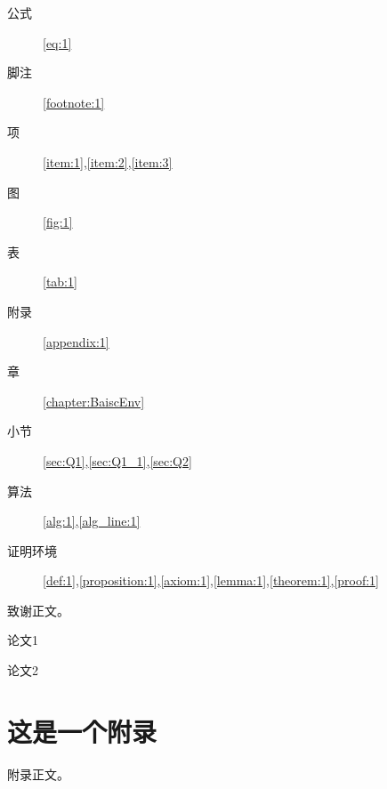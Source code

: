 \documentclass[format=draft,language=chinese,category=SDN]{hustreport}
\begin{document}
\begin{description}
  \item[公式] \autoref{eq:1}
  \item[脚注] \autoref{footnote:1}
  \item[项] \autoref{item:1},\autoref{item:2},\autoref{item:3}
  \item[图] \autoref{fig:1}
  \item[表] \autoref{tab:1}
  \item[附录] \autoref{appendix:1}
  \item[章] \autoref{chapter:BaiscEnv}
  \item[小节] \autoref{sec:Q1},\autoref{sec:Q1_1},\autoref{sec:Q2}
  \item[算法] \autoref{alg:1},\autoref{alg_line:1}
  \item[证明环境] \autoref{def:1},\autoref{proposition:1},\autoref{axiom:1},\autoref{lemma:1},\autoref{theorem:1},\autoref{proof:1}
\end{description}

\backmatter

\begin{ack}
致谢正文。
\end{ack}



\appendix

\begin{publications}
    \item 论文1
    \item 论文2
\end{publications}

\chapter{这是一个附录}\label{appendix:1}
附录正文。
\end{document}
